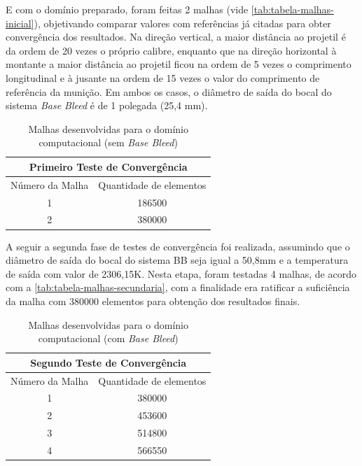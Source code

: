 E com o domínio preparado, foram feitas 2 malhas (vide \autoref{tab:tabela-malhas-inicial}), objetivando comparar valores com referências já citadas \cite{Mahmoud2009} para obter convergência dos resultados. Na direção vertical, a maior distância ao projetil é da ordem de 20 vezes o próprio calibre, enquanto que na direção horizontal à montante a maior distância ao projetil ficou na ordem de 5 vezes o comprimento longitudinal e à jusante na ordem de 15 vezes o valor do comprimento de referência da munição. Em ambos os casos, o diâmetro de saída do bocal do sistema \textit{Base Bleed} é de 1 polegada (25,4 mm).

\begin{table}[ht]
\centering
\caption[Malhas desenvolvidas para o domínio computacional (sem \textit{Base Bleed})]{Malhas desenvolvidas para o domínio computacional (sem \textit{Base Bleed})}
\vspace{0.5cm}
\begin{tabular}{c|c}
\multicolumn{2}{c}{Primeiro Teste de Convergência} \\
\hline 
Número da Malha & Quantidade de elementos \\ 
\hline
1 & 186500 \\
2 & 380000
\end{tabular}
\label{tab:tabela-malhas-inicial}
\end{table}

A seguir a segunda fase de testes de convergência foi realizada, assumindo que o diâmetro de saída do bocal do sistema BB seja igual a 50,8mm e a temperatura de saída com valor de 2306,15K. Nesta etapa, foram testadas 4 malhas, de acordo com a \autoref{tab:tabela-malhas-secundaria}, com a finalidade era ratificar a suficiência da malha com 380000 elementos para obtenção dos resultados finais.

\begin{table}[ht]
\centering
\caption[Malhas desenvolvidas para o domínio computacional (com \textit{Base Bleed})]{Malhas desenvolvidas para o domínio computacional (com \textit{Base Bleed})}
\vspace{0.5cm}
\begin{tabular}{c|c}
\multicolumn{2}{c}{Segundo Teste de Convergência} \\
\hline 
Número da Malha & Quantidade de elementos \\ 
\hline
1 & 380000 \\
2 & 453600 \\
3 & 514800 \\
4 & 566550
\end{tabular}
\label{tab:tabela-malhas-secundaria}
\end{table}

